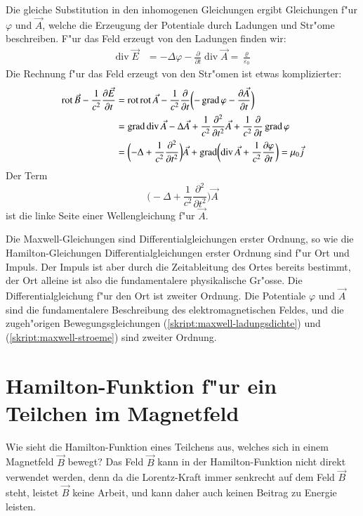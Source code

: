 Die gleiche Substitution in den inhomogenen Gleichungen ergibt Gleichungen
f"ur $\varphi$ und $\vec A$, welche die Erzeugung der Potentiale durch
Ladungen und Str"ome beschreiben.
F"ur das Feld erzeugt von den Ladungen finden wir:
\begin{align}
\operatorname{div}\vec E
&=
-\Delta\varphi -\frac{\partial}{\partial t}\operatorname{div}\vec A
=\frac{\varrho}{\varepsilon_0}
\label{skript:maxwell-ladungsdichte}
\end{align}
Die Rechnung f"ur das Feld erzeugt von den Str"omen ist etwas komplizierter:
\begin{align}
\operatorname{rot}\vec B-\frac1{c^2}\frac{\partial \vec E}{\partial t}
&=
\operatorname{rot}\operatorname{rot}\vec A
-\frac1{c^2}\frac{\partial}{\partial t}\biggl(
-\operatorname{grad}\varphi-\frac{\partial\vec A}{\partial t}
\biggr)
\notag
\\
&=
\operatorname{grad}\operatorname{div}\vec A
-\Delta \vec A+\frac{1}{c^2}\frac{\partial^2}{\partial t^2}\vec A
+\frac1{c^2}\frac{\partial}{\partial t}\operatorname{grad}\varphi
\notag
\\
&=
\biggl(-\Delta + \frac1{c^2}\frac{\partial^2}{\partial t^2}\biggr)\vec A
+\operatorname{grad}\biggl(\operatorname{div}\vec A +\frac1{c^2}\frac{\partial\varphi}{\partial t}\biggr)
=\mu_0\vec j
\label{skript:maxwell-stroeme}
\end{align}
Der Term
\[
\biggl(-\Delta + \frac1{c^2}\frac{\partial^2}{\partial t^2}\biggr)\vec A
\]
ist die linke Seite einer Wellengleichung f"ur $\vec A$.

Die Maxwell-Gleichungen sind Differentialgleichungen erster Ordnung,
so wie die Hamilton-Gleichungen Differentialgleichungen erster Ordnung
sind f"ur Ort und Impuls.
Der Impuls ist aber durch die Zeitableitung des Ortes bereits bestimmt,
der Ort alleine ist also die fundamentalere physikalische Gr"osse.
Die Differentialgleichung f"ur den Ort ist zweiter Ordnung.
Die Potentiale $\varphi$ und $\vec A$ sind die fundamentalere
Beschreibung des elektromagnetischen Feldes, und die zugeh"origen
Bewegungsgleichungen 
(\ref{skript:maxwell-ladungsdichte})
und
(\ref{skript:maxwell-stroeme})
sind zweiter Ordnung.

\section{Hamilton-Funktion f"ur ein Teilchen im Magnetfeld\label{section:hamilton-funktion-im-magnetfeld}}
Wie sieht die Hamilton-Funktion eines Teilchens aus, welches  sich in
einem Magnetfeld $\vec B$ bewegt?
Das Feld $\vec B$ kann in der Hamilton-Funktion nicht direkt
verwendet werden, denn da die Lorentz-Kraft immer senkrecht
auf dem Feld $\vec B$ steht, leistet $\vec B$ keine Arbeit, und kann
daher auch keinen Beitrag zu Energie leisten.

